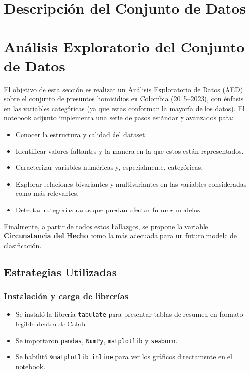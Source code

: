 \documentclass[lettersize,journal]{IEEEtran}
\begin{document}

\section{Descripción del Conjunto de Datos}


\section{Análisis Exploratorio del Conjunto de Datos}

El objetivo de esta sección es realizar un Análisis Exploratorio de Datos (AED) sobre el conjunto de presuntos homicidios en Colombia (2015–2023), con énfasis en las variables categóricas (ya que estas conforman la mayoría de los datos). El notebook adjunto implementa una serie de pasos estándar y avanzados para:

\begin{itemize}
    \item Conocer la estructura y calidad del dataset.
    \item Identificar valores faltantes y la manera en la que estos están representados.
    \item Caracterizar variables numéricas y, especialmente, categóricas.
    \item Explorar relaciones bivariantes y multivariantes en las variables consideradas como más relevantes.
    \item Detectar categorías raras que puedan afectar futuros modelos.
\end{itemize}

Finalmente, a partir de todos estos hallazgos, se propone la variable \textbf{Circunstancia del Hecho} como la más adecuada para un futuro modelo de clasificación.

\subsection{Estrategias Utilizadas}

\subsubsection{Instalación y carga de librerías}
\begin{itemize}
    \item Se instaló la librería \texttt{tabulate} para presentar tablas de resumen en formato legible dentro de Colab.
    \item Se importaron \texttt{pandas}, \texttt{NumPy}, \texttt{matplotlib} y \texttt{seaborn}.
    \item Se habilitó \texttt{\%matplotlib inline} para ver los gráficos directamente en el notebook.
\end{itemize}
\end{document}
